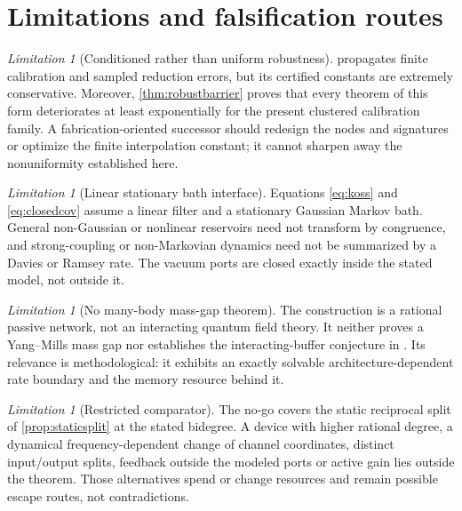 \documentclass[11pt]{article}
\theoremstyle{definition}
\theoremstyle{remark}
\newtheorem{limitation}[theorem]{Limitation}
\begin{document}
\section{Limitations and falsification routes}\label{sec:limits}

\begin{limitation}[Conditioned rather than uniform robustness]
 propagates finite calibration and sampled reduction errors,
but its certified constants are extremely conservative.  Moreover,
\cref{thm:robustbarrier} proves that every theorem of this form deteriorates
at least exponentially for the present clustered calibration family.  A
fabrication-oriented successor should redesign the nodes and signatures or
optimize the finite interpolation constant; it cannot sharpen away the
nonuniformity established here.
\end{limitation}

\begin{limitation}[Linear stationary bath interface]
Equations \eqref{eq:koss} and \eqref{eq:closedcov} assume a linear filter and
a stationary Gaussian Markov bath.  General non-Gaussian or nonlinear
reservoirs need not transform by congruence, and strong-coupling or
non-Markovian dynamics need not be summarized by a Davies or Ramsey rate.
The vacuum ports are closed exactly inside the stated model, not outside it.
\end{limitation}

\begin{limitation}[No many-body mass-gap theorem]
The construction is a rational passive network, not an interacting quantum
field theory.  It neither proves a Yang--Mills mass gap nor establishes the
interacting-buffer conjecture in \cite{ErikssonCut2026}.  Its relevance is
methodological: it exhibits an exactly solvable architecture-dependent rate
boundary and the memory resource behind it.
\end{limitation}

\begin{limitation}[Restricted comparator]
The no-go covers the static reciprocal split of \cref{prop:staticsplit} at the
stated bidegree.  A device with higher rational degree, a dynamical
frequency-dependent change of channel coordinates, distinct input/output
splits, feedback outside the modeled ports or active gain lies outside the
theorem.  Those alternatives spend or change resources and remain possible
escape routes, not contradictions.
\end{limitation}
\end{document}
